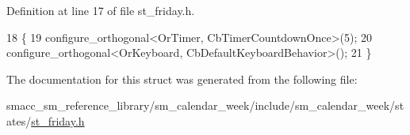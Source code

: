 Definition at line 17 of file st\+\_\+friday.\+h.


\begin{DoxyCode}
18     \{
19         configure\_orthogonal<OrTimer,  CbTimerCountdownOnce>(5);    
20         configure\_orthogonal<OrKeyboard, CbDefaultKeyboardBehavior>();
21     \}
\end{DoxyCode}


The documentation for this struct was generated from the following file\+:\begin{DoxyCompactItemize}
\item 
smacc\+\_\+sm\+\_\+reference\+\_\+library/sm\+\_\+calendar\+\_\+week/include/sm\+\_\+calendar\+\_\+week/states/\hyperlink{st__friday_8h}{st\+\_\+friday.\+h}\end{DoxyCompactItemize}
